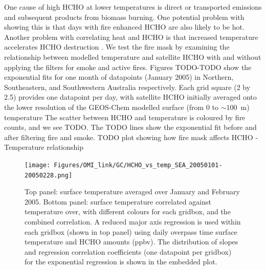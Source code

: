       
      
      
      One cause of high HCHO at lower temperatures is direct or transported emissions and subsequent products from biomass burning.
      One potential problem with showing this is that days with fire enhanced HCHO are also likely to be hot.
      Another problem with correlating heat and HCHO is that increased temperature accelerates HCHO destruction \parencite{Zheng2015}.
      We test the fire mask by examining the relationship between modelled temperature and satellite HCHO with and without applying the filters for smoke and active fires.
      Figures TODO-TODO show the exponential fits for one month of datapoints (January 2005) in Northern, Southeastern, and Southwestern Australia respectively.
      Each grid square (2 by 2.5\degr) provides one datapoint per day, with satellite HCHO initially averaged onto the lower resolution of the GEOS-Chem modelled surface (from 0 to $\sim 100$~m) temperature
      The scatter between HCHO and temperature is coloured by fire counts, and we see TODO.
      The TODO lines show the exponential fit before and after filtering fire and smoke.
      TODO plot showing how fire mask affects HCHO - Temperature relationship
      
      
      \begin{figure}
        \texttt{[image: Figures/OMI\_link/GC/HCHO\_vs\_temp\_SEA\_20050101-20050228.png]}
        \caption{%
          Top panel: surface temperature averaged over January and February 2005.
          Bottom panel: surface temperature correlated against temperature over, with different colours for each gridbox, and the combined correlation. 
          A reduced major axis regression is used within each gridbox (shown in top panel) using daily overpass time surface temperature and HCHO amounts (ppbv).
          The distribution of slopes and regression correlation coefficients (one datapoint per gridbox) for the exponential regression is shown in the embedded plot.
          }
        \label{Model:Analysis:HCHO:fig_hcho_vs_temp_SEA_200501}
        \end{figure}
          
